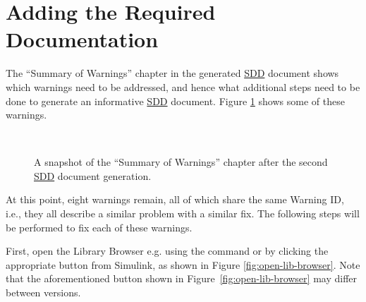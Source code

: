 \documentclass{mcscert}
\newcommand{\simulink}{Simulink}
\begin{document}
\section*{Adding the Required Documentation}
The ``Summary of Warnings'' chapter in the generated \hyperref[acr:sdd]{SDD} document shows which warnings need to be addressed, and hence what additional steps need to be done to generate an informative \hyperref[acr:sdd]{SDD} document. 
Figure \ref{fig:summary-of-warnings-2} shows some of these warnings.

\begin{figure}
	\caption{A snapshot of the ``Summary of Warnings'' chapter after the second \hyperref[acr:sdd]{SDD}	document generation.}
	\centering
	\label{fig:summary-of-warnings-2}
	\\
\end{figure}

At this point, eight warnings remain, all of which share the same Warning ID, i.e., they all describe a similar problem with a similar fix.
The following steps will be performed to fix each of these warnings.

First, open the Library Browser e.g. using the  command or by clicking the appropriate button from \simulink{}, as shown in Figure \ref{fig:open-lib-browser}. 
Note that the aforementioned button shown in Figure~\ref{fig:open-lib-browser}
may differ between \matlab{} versions.
\end{document}
